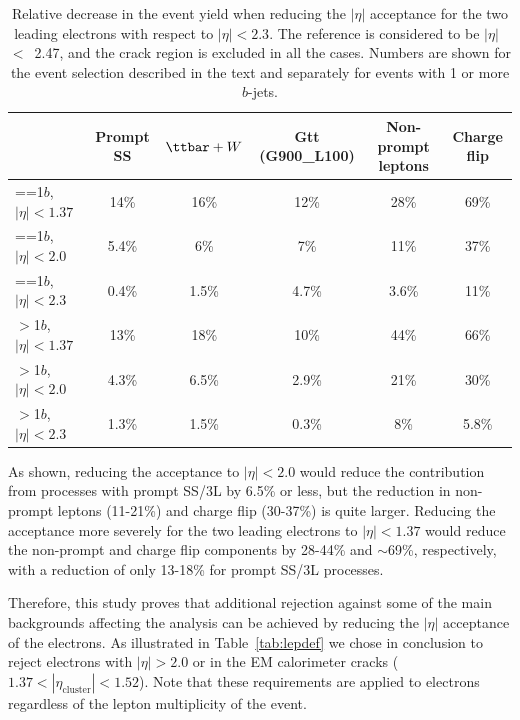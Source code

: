 \begin{table}[htb]
\caption{Relative decrease in the event yield when reducing the $|\eta|$ acceptance for the two leading electrons with respect to $|\eta|<2.3$. The reference is considered to be $|\eta|$~$<$~2.47, and the crack region is excluded in all the cases. Numbers are shown for the event selection described in the text and separately for events with 1 or more $b$-jets.}
\label{tab:eleEta}
\begin{center}
    \begin{tabular}{|l|c|c|c|c|c|} \hline
                   & Prompt SS & $\ttbar +W$ & Gtt (G900\_L100) & Non-prompt leptons & Charge flip \\ \hline\hline
==1$b$, $|\eta|<1.37$ & 14\% & 16\% & 12\%  & 28\% & 69\% \\
==1$b$, $|\eta|<2.0$  & 5.4\%  & 6\%  & 7\%&  11\% & 37\% \\ 
==1$b$, $|\eta|<2.3$  & 0.4\%  & 1.5\%  & 4.7\%&  3.6\% &  11\% \\ \hline
$>$1$b$, $|\eta|<1.37$ & 13\% & 18\% & 10\%  & 44\% & 66\% \\
$>$1$b$, $|\eta|<2.0$  & 4.3\%  & 6.5\%  & 2.9\%&  21\% &  30\% \\ 
$>$1$b$, $|\eta|<2.3$  & 1.3\%  & 1.5\%  & 0.3\%&  8\% &  5.8\% \\  \hline
\end{tabular}
\end{center}
\end{table}

As shown, reducing the acceptance to $|\eta|<2.0$ would reduce the contribution from processes with prompt 
SS/3L by 6.5\% or less, but the reduction in non-prompt leptons (11-21\%) and charge flip (30-37\%) is quite larger. 
Reducing the acceptance more severely for the two leading electrons to $|\eta|<1.37$ would reduce the non-prompt and 
charge flip components by 28-44\% and $\sim$69\%, respectively, with a reduction of only 13-18\% for prompt SS/3L processes. 

Therefore, this study proves that additional rejection against some of the main backgrounds affecting the analysis can be achieved 
by reducing the $|\eta|$ acceptance of the electrons. 
As illustrated in Table~\ref{tab:lepdef} we chose in conclusion to reject electrons with $|\eta|>2.0$ or in the EM calorimeter cracks ($1.37<|\eta_\text{cluster}|<1.52$). 
Note that these requirements are applied to electrons regardless of the lepton multiplicity of the event.


